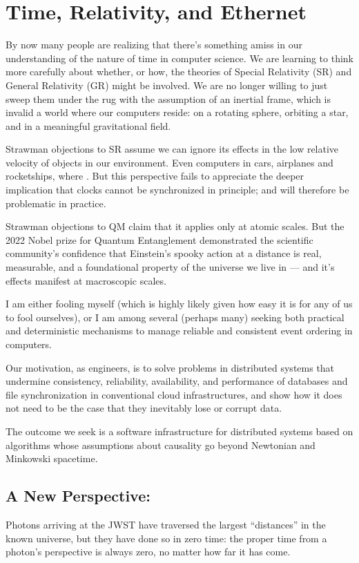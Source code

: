 \section{Time, Relativity, and Ethernet}
By now many people are realizing that there’s something amiss in our understanding of the nature of time in computer science. We are learning to think more carefully about whether, or how, the theories of Special Relativity (SR) and General Relativity (GR) might be involved. We are no longer willing to just sweep them under the rug with the assumption of an inertial frame, which is invalid a world where our computers reside: on a rotating sphere, orbiting a star, and in a meaningful gravitational field.

Strawman objections to SR assume we can ignore its effects in the low relative velocity of objects in our environment. Even computers in cars, airplanes and rocketships, where .  But this perspective fails to appreciate the deeper implication that clocks cannot be synchronized in principle; and will therefore be problematic in practice.

Strawman objections to QM claim that it applies only at atomic scales. But the 2022 Nobel prize for Quantum Entanglement demonstrated the scientific community’s confidence that Einstein’s spooky action at a distance is real, measurable, and a foundational property of the universe we live in — and it’s effects manifest at macroscopic scales.

I am either fooling myself (which is highly likely given how easy it is for any of us to fool ourselves), or I am among several (perhaps many) seeking both practical and deterministic mechanisms to manage reliable and consistent event ordering in computers.

Our motivation, as engineers, is to solve problems in distributed systems that undermine consistency, reliability, availability, and performance of databases and file synchronization in conventional cloud infrastructures, and show how it does not need to be the case that they inevitably lose or corrupt data.

The outcome we seek is a software infrastructure for distributed systems based on algorithms whose assumptions about causality go beyond Newtonian and Minkowski spacetime.

\subsection{A New Perspective:}
Photons arriving at the JWST have traversed the largest “distances” in the known universe, but they have done so in zero time: the proper time from a photon’s perspective is always zero, no matter how far it has come. 

